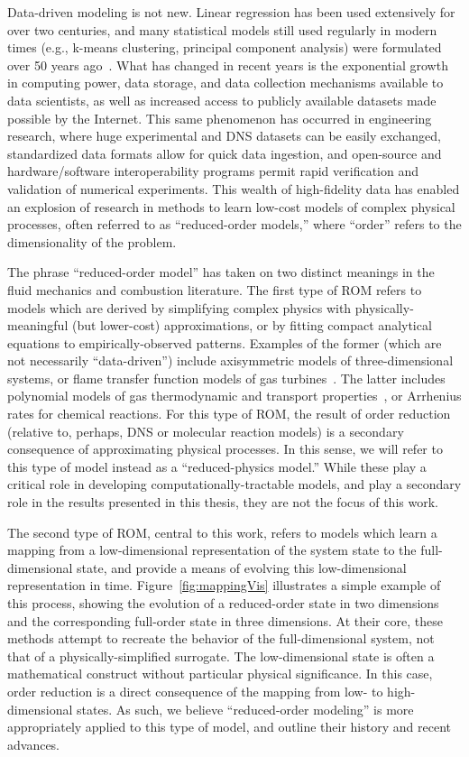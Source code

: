 Data-driven modeling is not new. Linear regression has been used extensively for over two centuries, and many statistical models still used regularly in modern times (e.g., k-means clustering, principal component analysis) were formulated over 50 years ago~\cite{dataScience}. What has changed in recent years is the exponential growth in computing power, data storage, and data collection mechanisms available to data scientists, as well as increased access to publicly available datasets made possible by the Internet. This same phenomenon has occurred in engineering research, where huge experimental and DNS datasets can be easily exchanged, standardized data formats allow for quick data ingestion, and open-source and hardware/software interoperability programs permit rapid verification and validation of numerical experiments. This wealth of high-fidelity data has enabled an explosion of research in methods to learn low-cost models of complex physical processes, often referred to as ``reduced-order models,'' where ``order'' refers to the dimensionality of the problem.

The phrase ``reduced-order model'' has taken on two distinct meanings in the fluid mechanics and combustion literature. The first type of ROM refers to models which are derived by simplifying complex physics with physically-meaningful (but lower-cost) approximations, or by fitting compact analytical equations to empirically-observed patterns. Examples of the former (which are not necessarily ``data-driven'') include axisymmetric models of three-dimensional systems, or flame transfer function models of gas turbines~\cite{Schuller2002}. The latter includes polynomial models of gas thermodynamic and transport properties~\cite{McBride1993}, or Arrhenius rates for chemical reactions. For this type of ROM, the result of order reduction (relative to, perhaps, DNS or molecular reaction models) is a secondary consequence of approximating physical processes. In this sense, we will refer to this type of model instead as a ``reduced-physics model.'' While these play a critical role in developing computationally-tractable models, and play a secondary role in the results presented in this thesis, they are not the focus of this work.

The second type of ROM, central to this work, refers to models which learn a mapping from a low-dimensional representation of the system state to the full-dimensional state, and provide a means of evolving this low-dimensional representation in time. Figure~\ref{fig:mappingVis} illustrates a simple example of this process, showing the evolution of a reduced-order state in two dimensions and the corresponding full-order state in three dimensions. At their core, these methods attempt to recreate the behavior of the full-dimensional system, not that of a physically-simplified surrogate. The low-dimensional state is often a mathematical construct without particular physical significance. In this case, order reduction is a direct consequence of the mapping from low- to high-dimensional states. As such, we believe ``reduced-order modeling'' is more appropriately applied to this type of model, and outline their history and recent advances.

